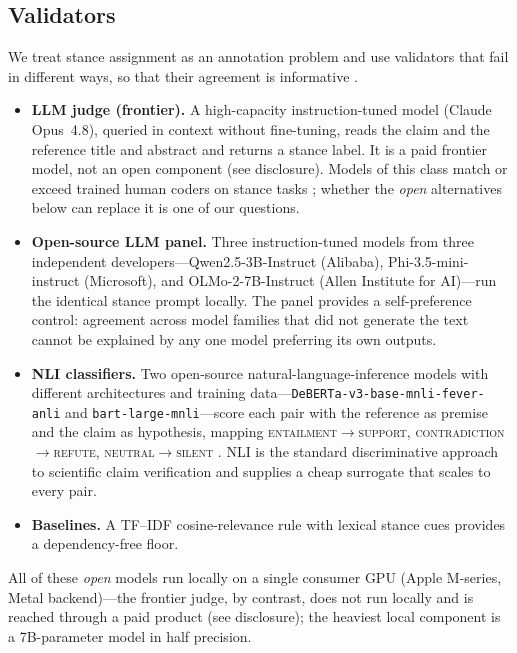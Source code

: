 \subsection{Validators}
\label{sec:methods-validators}
We treat stance assignment as an annotation problem and use validators that fail in different ways, so
that their agreement is informative \citep{zheng2023judging}.
\begin{itemize}
  \item \textbf{LLM judge (frontier).} A high-capacity instruction-tuned model (Claude Opus~4.8),
  queried in context without fine-tuning, reads the claim and the reference title and abstract and
  returns a stance label. It is a paid frontier model, not an open component (see disclosure). Models of
  this class match or exceed trained human coders on stance tasks
  \citep{gilardi2023chatgpt,heseltine2024llm,tornberg2025llm}; whether the \emph{open} alternatives below
  can replace it is one of our questions.
  \item \textbf{Open-source LLM panel.} Three instruction-tuned models from three independent
  developers---Qwen2.5-3B-Instruct (Alibaba), Phi-3.5-mini-instruct (Microsoft), and
  OLMo-2-7B-Instruct (Allen Institute for AI)---run the identical stance prompt locally. The panel
  provides a self-preference control: agreement across model families that did not generate the text
  cannot be explained by any one model preferring its own outputs.
  \item \textbf{NLI classifiers.} Two open-source natural-language-inference models with different
  architectures and training data---\texttt{DeBERTa-v3-base-mnli-fever-anli} and
  \texttt{bart-large-mnli}---score each pair with the reference as premise and the claim as hypothesis,
  mapping \textsc{entailment}$\rightarrow$\textsc{support},
  \textsc{contradiction}$\rightarrow$\textsc{refute}, \textsc{neutral}$\rightarrow$\textsc{silent}
  \citep{yin2019benchmarking,laurer2024less}. NLI is the standard discriminative approach to scientific
  claim verification \citep{wadden2020fact,koneru2024llm} and supplies a cheap surrogate that scales to
  every pair.
  \item \textbf{Baselines.} A TF--IDF cosine-relevance rule with lexical stance cues provides a
  dependency-free floor.
\end{itemize}
All of these \emph{open} models run locally on a single consumer GPU (Apple M-series, Metal backend)---the
frontier judge, by contrast, does not run locally and is reached through a paid product (see
disclosure); the heaviest local component
is a 7B-parameter model in half precision.

